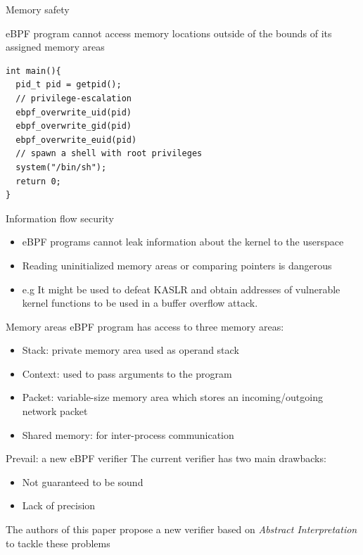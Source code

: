 \documentclass[aspectratio=169]{beamer}
\begin{document}
\begin{frame}[fragile]{Memory safety}

  eBPF program cannot access memory locations outside of the bounds of its assigned memory areas
  \begin{lstlisting}[frame=single]
int main(){
  pid_t pid = getpid();
  // privilege-escalation
  ebpf_overwrite_uid(pid)
  ebpf_overwrite_gid(pid)
  ebpf_overwrite_euid(pid)
  // spawn a shell with root privileges
  system("/bin/sh");
  return 0;
}
\end{lstlisting}
\end{frame}

\begin{frame}{Information flow security}
  \begin{itemize}
    \item eBPF programs cannot leak information about the kernel to the userspace
    \item Reading uninitialized memory areas or comparing pointers is dangerous
    \item e.g It might be used to defeat KASLR and obtain addresses of vulnerable kernel functions to
          be used in a buffer overflow attack.
  \end{itemize}
  \centering


\end{frame}

\begin{frame}{Memory areas}
  eBPF program has access to three memory areas:
  \begin{itemize}
    \item Stack: private memory area used as operand stack
    \item Context: used to pass arguments to the program
    \item Packet: variable-size memory area which stores an incoming/outgoing network packet
    \item Shared memory: for inter-process communication
  \end{itemize}
\end{frame}

\begin{frame}{Prevail: a new eBPF verifier}
  The current verifier has two main drawbacks:
  \begin{itemize}
    \item Not guaranteed to be sound
    \item Lack of precision
  \end{itemize}
  The authors of this paper propose a new verifier based on \textit{Abstract Interpretation} to tackle these
  problems
\end{frame}
\end{document}
